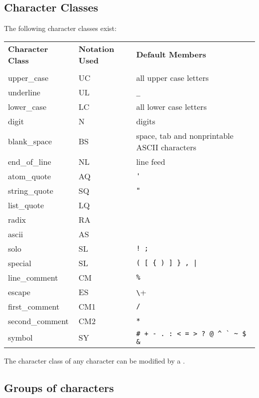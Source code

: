 \subsection{Character Classes}
\label{charclass}

The following character classes exist:
\vspace{0.3cm}

\begin{tabular}{lll}
{\bf Character Class}   &       {\bf Notation Used }    & {\bf Default Members} \\
\\
upper\_case     &       UC      &all upper case letters\\
underline       &       UL      &\verb+_+\\
lower\_case     &       LC      &all lower case letters\\
digit           &       N       &digits\\
blank\_space    &       BS      &space, tab and nonprintable ASCII characters\\
end\_of\_line   &       NL      &line feed\\
atom\_quote     &       AQ      &\verb+'+\\
string\_quote   &       SQ      &\verb+"+\\
list\_quote     &       LQ      & \\
radix           &       RA      & \\
ascii           &       AS      & \\
solo            &       SL      &\verb+! ; +\\
special         &       SL      &\verb+( [ { ) ] } , | +\\
line\_comment   &       CM      &\verb+%+\\
escape          &       ES      &\verb+\+\\
first\_comment  &       CM1     &\verb+/+\\
second\_comment &       CM2     &\verb+*+\\
symbol          &       SY      &\verb/# + - . : < = > ? @ ^ ` ~ $ & /\\
\end{tabular}

The character class of any character can be modified by a
.


\subsection{Groups of characters}

